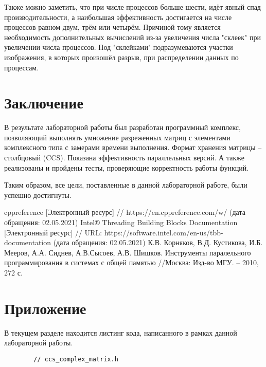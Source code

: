 \documentclass{report}
\begin{document}
\begin{itemize}
\begin{itemize}
	\par Также можно заметить, что при числе процессов больше шести, идёт явный спад производительности, а наибольшая эффективность достигается на числе процессов равном двум, трём или четырём. Причиной тому является необходимость дополнительных вычислений из-за увеличения числа "склеек" при увеличении числа процессов. Под "склейками" подразумеваются участки изображения, в которых произошёл разрыв, при распределении данных по процессам.
	\newpage


	\section*{Заключение}
		\par В результате лабораторной работы был разработан программный комплекс, позволяющий выполнять умножение разреженных матриц с элементами комплексного типа с замерами времени выполнения. Формат хранения матрицы – столбцовый (CCS). Показана эффективность параллельных версий. А также реализованы и пройдены тесты, проверяющие корректность работы функций.
		\par Таким образом, все цели, поставленные в данной лабораторной работе, были успешно достигнуты.
	\newpage


	\begin{thebibliography}{1}
		 cppreference [Электронный ресурс] // https://en.cppreference.com/w/ (дата обращения: 02.05.2021)
         Intel® Threading Building Blocks Documentation [Электронный ресурс] // URL: https://software.intel.com/en-us/tbb-documentation (дата обращения: 02.05.2021)
		 К.В. Корняков, В.Д. Кустикова, И.Б. Мееров, А.А. Сиднев, А.В.Сысоев, А.В. Шишков. Инструменты паралельного программирования в системах с общей памятью //Москва: Изд-во МГУ. – 2010, 272 с.
	\end{thebibliography}
	\newpage


	\section*{Приложение}
	\par В текущем разделе находится листинг кода, написанного в рамках данной лабораторной работы.
	\begin{lstlisting}
		// ccs_complex_matrix.h
		

\end{lstlisting}
\end{itemize}
\end{itemize}
\end{document}
